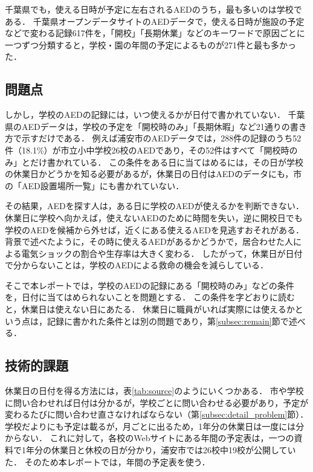 \documentclass[a4paper,12pt,oneside]{jex}
\begin{document}
千葉県でも，使える日時が予定に左右されるAEDのうち，最も多いのは学校である．
千葉県オープンデータサイトのAEDデータ\cite{chiba_od}で，使える日時が施設の予定などで変わる記録617件を，「開校」「長期休業」などのキーワードで原因ごとに一つずつ分類すると，学校・園の年間の予定によるものが271件と最も多かった．

\subsection{問題点}
\label{subsec:problem}

しかし，学校のAEDの記録には，いつ使えるかが日付で書かれていない．
千葉県のAEDデータは，学校の予定を「開校時のみ」「長期休暇」など21通りの書き方で示すだけである\cite{chiba_od}．
例えば浦安市のAEDデータでは，288件の記録のうち52件（18.1\%）が市立小中学校26校のAEDであり，その52件はすべて「開校時のみ」とだけ書かれている\cite{urayasu_aed}．
この条件をある日に当てはめるには，その日が学校の休業日かどうかを知る必要があるが，休業日の日付はAEDのデータにも，市の「AED設置場所一覧」にも書かれていない\cite{urayasu_city}．

その結果，AEDを探す人は，ある日に学校のAEDが使えるかを判断できない．
休業日に学校へ向かえば，使えないAEDのために時間を失い，逆に開校日でも学校のAEDを候補から外せば，近くにある使えるAEDを見逃すおそれがある．
背景で述べたように，その時に使えるAEDがあるかどうかで，居合わせた人による電気ショックの割合や生存率は大きく変わる．
したがって，休業日が日付で分からないことは，学校のAEDによる救命の機会を減らしている．

そこで本レポートでは，学校のAEDの記録にある「開校時のみ」などの条件を，日付に当てはめられないことを問題とする．
この条件を字どおりに読むと，休業日は使えない日にあたる．
休業日に職員がいれば実際には使えるかという点は，記録に書かれた条件とは別の問題であり，第\ref{subsec:remain}節で述べる．

\subsection{技術的課題}
\label{subsec:issue}

休業日の日付を得る方法には，表\ref{tab:source}のようにいくつかある．
市や学校に問い合わせれば日付は分かるが，学校ごとに問い合わせる必要があり，予定が変わるたびに問い合わせ直さなければならない（第\ref{subsec:detail_problem}節）．
学校だよりにも予定は載るが，月ごとに出るため，1年分の休業日は一度には分からない．
これに対して，各校のWebサイトにある年間の予定表は，一つの資料で1年分の休業日と休校の日が分かり，浦安市では26校中19校が公開していた．
そのため本レポートでは，年間の予定表を使う．
\end{document}
